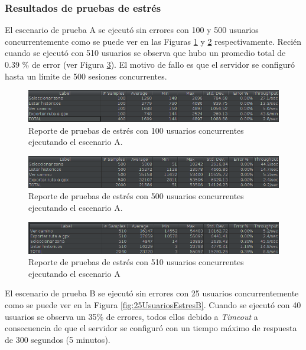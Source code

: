 \subsubsection{Resultados de pruebas de estrés}
\label{ref:resultadosPruebaEstres}

El escenario de prueba A se ejecutó sin errores con 100 y 500 usuarios concurrentemente como se puede ver en las Figuras \ref{fig:100UsuariosEstresA} y \ref{fig:500UsuariosEstresA} respectivamente. Recién cuando se ejecutó con 510 usuarios se observa que hubo un promedio total de 0.39 \% de error (ver Figura \ref{fig:510UsuariosEstresA}). El motivo de fallo es que el servidor se configuró hasta un límite de 500 sesiones concurrentes.

\begin{figure}[H]
    \centering
    \includegraphics[width=\textwidth]{100_usuarios_sin_optimizacion_editado_.png}
    \caption{Reporte de pruebas de estrés con 100 usuarios concurrentes ejecutando el escenario A.}
    \label{fig:100UsuariosEstresA}
\end{figure}

\begin{figure}[H]
    \centering
    \includegraphics[width=\textwidth]{500_usuarios_sin_optimizacion_editado_.png}
    \caption{Reporte de pruebas de estrés con 500 usuarios concurrentes ejecutando el escenario A.}
    \label{fig:500UsuariosEstresA}
\end{figure}

\begin{figure}[H]
    \centering
    \includegraphics[width=\textwidth]{510_usuarios_sin_optimizacion_editado_.png}
    \caption{Reporte de pruebas de estrés con 510 usuarios concurrentes ejecutando el escenario A}
    \label{fig:510UsuariosEstresA}
\end{figure}

El escenario de prueba B se ejecutó sin errores con 25 usuarios concurrentemente como se puede ver en la Figura \ref{fig:25UsuariosEstresB}. Cuando se ejecutó con 40 usuarios se observa un 35\% de errores, todos ellos debido a \textit{Timeout} a consecuencia de que el servidor se configuró con un tiempo máximo de respuesta de 300 segundos (5 minutos).

